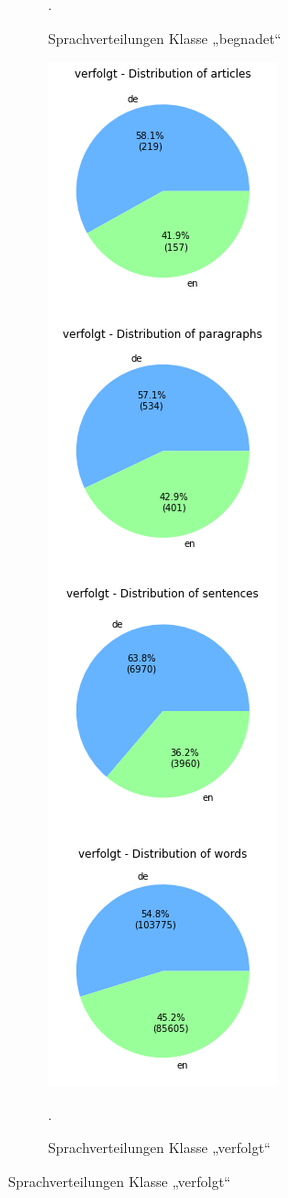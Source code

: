 \documentclass[ngerman]{ttlab-qualify}
\begin{document}
\begin{figure}[htb]
\begin{subfigure}[t]{.45\textwidth}
        \caption{Sprachverteilungen Klasse „begnadet“}.
        \label{Sprachverteilungen_begnadet}
    \end{subfigure}%
    \begin{subfigure}[t]{.45\textwidth}
      \centering
        \includegraphics[width=.7\textwidth]{grafiken/Sprachverteilungen_verfolgt_en_de.png}
        \caption{Sprachverteilungen Klasse „verfolgt“}.
        \label{Sprachverteilungen_verfolgt}
    \end{subfigure}
\end{figure}
\end{document}
